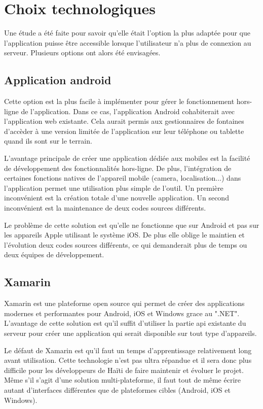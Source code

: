 \documentclass{EPL-master-thesis-covers-FR}
\begin{document}
		
		\section{Choix technologiques}
		
			
			\label{sec:choix_tech}
			Une étude a été faite pour savoir qu'elle était l'option la plus adaptée pour que l'application puisse être accessible lorsque l'utilisateur n'a plus de connexion au serveur. Plusieurs options ont alors été envisagées.
			
			\subsection*{Application android}
				Cette option est la plus facile à implémenter pour gérer le fonctionnement hors-ligne de l'application. Dans ce cas, l'application Android cohabiterait avec l'application web existante. Cela aurait permis aux gestionnaires de fontaines d'accèder à une version limitée de l'application sur leur téléphone ou tablette quand ils sont sur le terrain.
				
				L'avantage principale de créer une application dédiée aux mobiles est la facilité de développement des fonctionnalités hors-ligne. De plus, l'intégration de certaines fonctions natives de l'appareil mobile (camera, localisation...) dans l'application permet une utilisation plus simple de l'outil. Un première inconvénient est la création totale d'une nouvelle application. Un second inconvénient est la maintenance de deux codes sources différents.
			
				Le problème de cette solution est qu'elle ne fonctionne que sur Android et pas sur les appareils Apple utilisant le système iOS. De plus elle oblige le maintien et l'évolution deux codes sources différents, ce qui demanderait plus de temps ou deux équipes de développement.
				
			\subsection*{Xamarin}
				Xamarin \cite{ref:xamarin} est une plateforme open source qui permet de créer des applications modernes et performantes pour Android, iOS et Windows grace au ".NET". L'avantage de cette solution est qu'il suffit d'utiliser la partie \gls{api} existante du serveur pour créer une application qui serait disponible sur tout type d'appareils.
			
				Le défaut de Xamarin est qu'il faut un temps d'apprentissage relativement long avant utilisation. Cette technologie n'est pas ultra répandue et il sera donc plus difficile pour les développeurs de Haïti de faire maintenir et évoluer le projet. Même s'il s'agit d'une solution multi-plateforme, il faut tout de même écrire autant d'interfaces différentes que de plateformes cibles (Android, iOS et Windows).
				
\end{document}
